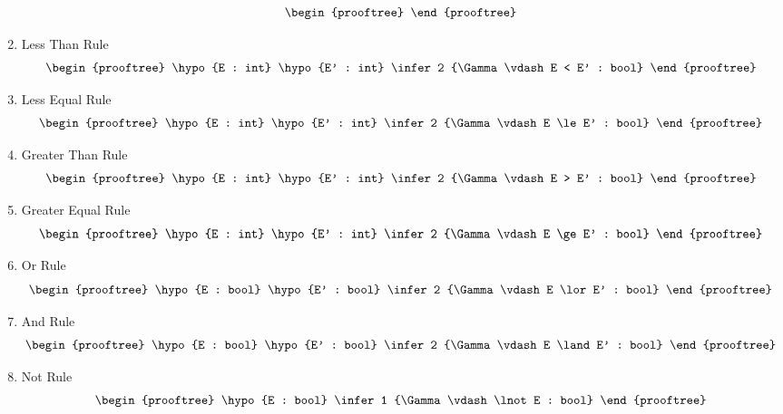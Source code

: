 \begin{multicols}{2}
\begin{enumerate}
\[\begin{prooftree}
            \end{prooftree} 
        \]
    \item Less Than Rule
        \[
            \begin{prooftree}
                \hypo {E : int}
                \hypo {E' : int}
                \infer 2 {\Gamma \vdash E < E' : bool}
            \end{prooftree} 
        \]
    \item Less Equal Rule
        \[
            \begin{prooftree}
                \hypo {E : int}
                \hypo {E' : int}
                \infer 2 {\Gamma \vdash E \le E' : bool}
            \end{prooftree} 
        \]
    \item Greater Than Rule
        \[
            \begin{prooftree}
                \hypo {E : int}
                \hypo {E' : int}
                \infer 2 {\Gamma \vdash E > E' : bool}
            \end{prooftree} 
        \]
        \item Greater Equal Rule
        \[
            \begin{prooftree}
                \hypo {E : int}
                \hypo {E' : int}
                \infer 2 {\Gamma \vdash E \ge E' : bool}
            \end{prooftree} 
        \]
        \item Or Rule
        \[
            \begin{prooftree}
                \hypo {E : bool}
                \hypo {E' : bool}
                \infer 2 {\Gamma \vdash E \lor E' : bool}
            \end{prooftree} 
        \]
        \item And Rule
        \[
            \begin{prooftree}
                \hypo {E : bool}
                \hypo {E' : bool}
                \infer 2 {\Gamma \vdash E \land E' : bool}
            \end{prooftree} 
        \]
        \item Not Rule
        \[
            \begin{prooftree}
                \hypo {E : bool}
                \infer 1 {\Gamma \vdash \lnot E : bool}
            \end{prooftree} 
        \]

\end{enumerate}
\end{multicols}

